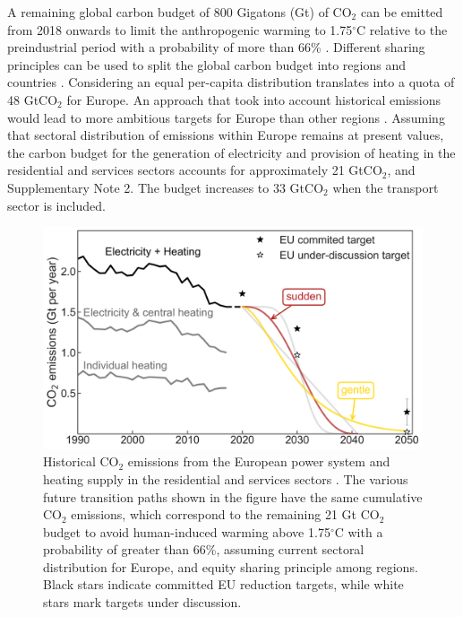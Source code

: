 \documentclass[5p]{elsarticle} %
\begin{document}
A remaining global carbon budget of 800 Gigatons (Gt) of CO$_2$ can be emitted from 2018 onwards to limit the anthropogenic warming to 1.75$^{\circ}$C relative to the preindustrial period with a probability of more than 66\% \cite{IPCC_1.5}. Different sharing principles can be used to split the global carbon budget into regions and countries \cite{Raupach_2014}. Considering an equal per-capita distribution translates into a quota of 48 GtCO$_2$ for Europe. An approach that took into account historical emissions would lead to more ambitious targets for Europe than other regions \cite{Matthews_2016}. Assuming that sectoral distribution of emissions within Europe remains at present values, the carbon budget for the generation of electricity and provision of heating in the residential and services sectors accounts for approximately 21 GtCO$_2$, \cite{UNFCCC_inventory} and Supplementary Note 2. The budget increases to 33 GtCO$_2$ when the transport sector is included. \\ 

\begin{figure}[!h]
\centering
	\includegraphics[width=\columnwidth]{../figures/carbon_budget.png}
\caption{Historical CO$_2$ emissions from the European power system and heating supply in the residential and services sectors \cite{UNFCCC_inventory}. The various future transition paths shown in the figure have the same cumulative CO$_2$ emissions, which correspond to the remaining 21 Gt CO$_2$ budget to avoid human-induced warming above 1.75$^{\circ}$C with a probability of greater than 66\%, assuming current sectoral distribution for Europe, and equity sharing principle among regions. Black stars indicate committed EU reduction targets, while white stars mark targets under discussion.} \label{fig_carbon_budget} 
\end{figure}
\end{document}

